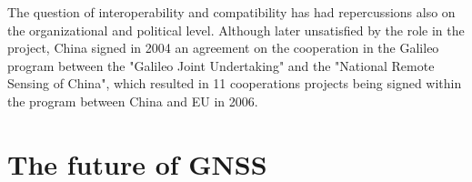 The question of interoperability and compatibility has had repercussions also on
the organizational and political level. Although later unsatisfied by the role
in the project, China signed in 2004 an agreement on the cooperation in the
Galileo program between the "Galileo Joint Undertaking" and the "National Remote
Sensing of China", which resulted in 11 cooperations projects being signed
within the program between China and EU in 2006.

\section{The future of GNSS}
